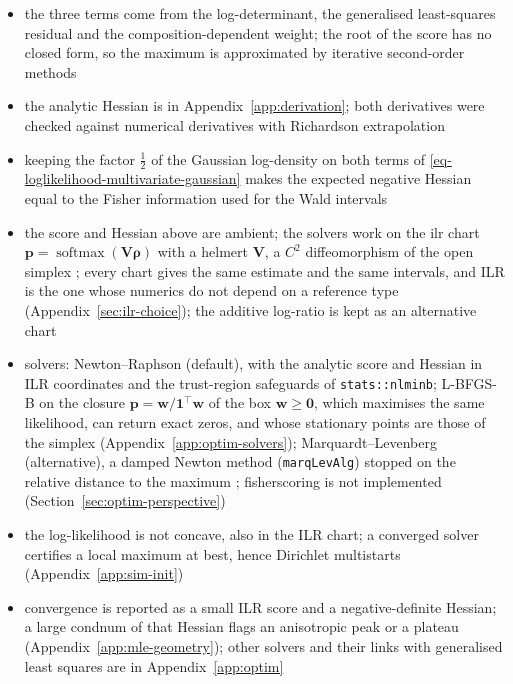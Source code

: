 \documentclass[pdflatex, sn-nature]{sn-jnl}
\theoremstyle{thmstyleone}%
\theoremstyle{thmstyletwo}%
\theoremstyle{thmstylethree}%
\begin{document}
\begin{itemize}
  \item the three terms come from the log-determinant, the generalised least-squares residual and the
        composition-dependent weight; the root of the score has no closed form, so the maximum is
        approximated by iterative second-order methods
  \item the analytic Hessian is in Appendix~\ref{app:derivation}; both derivatives were checked against
        numerical derivatives with Richardson extrapolation \cite{R-numDeriv}
  \item keeping the factor \(\frac12\) of the Gaussian log-density on both terms of
        \eqref{eq-loglikelihood-multivariate-gaussian} makes the expected negative Hessian equal to the
        Fisher information used for the Wald intervals
  \item the score and Hessian above are \gls{ambient}; the solvers work on the \gls{ilr} \gls{chart}
        \(\boldsymbol{p}=\operatorname{softmax}(\mathbf{V}\boldsymbol{\rho})\) with a \gls{helmert} \(\mathbf{V}\), a \(C^{2}\) diffeomorphism of the
        open simplex \cite{egozcueIsometricLogratioTransformations2003}; every chart gives the same estimate and the
        same intervals, and ILR is the one whose numerics do not depend on a reference type
        (Appendix~\ref{sec:ilr-choice}); the additive log-ratio is kept as an alternative chart
  \item solvers: Newton--Raphson (default), with the analytic score and Hessian in ILR coordinates and the
        trust-region safeguards of \texttt{stats::nlminb}; L-BFGS-B on the closure
        \(\boldsymbol{p}=\boldsymbol{w}/\mathbf{1}^{\top}\boldsymbol{w}\) of the box \(\boldsymbol{w}\ge\mathbf{0}\), which maximises the same
        likelihood, can return exact zeros, and whose stationary points are those of the simplex
        (Appendix~\ref{app:optim-solvers}); Marquardt--Levenberg (alternative), a damped Newton
        method (\texttt{marqLevAlg}) stopped on the relative distance to the maximum
        \cite{marquardtAlgorithmLeastSquaresEstimation1963,philippsRobustEfficientOptimization2021,commengesNewtonLikeAlgorithmLikelihood2006};
        \gls{fisherscoring} is not implemented (Section~\ref{sec:optim-perspective})
  \item the log-likelihood is not concave, also in the ILR chart; a converged solver certifies a
        local maximum at best, hence Dirichlet multistarts (Appendix~\ref{app:sim-init})
  \item convergence is reported as a small ILR score and a negative-definite Hessian; a large \gls{condnum}
        of that Hessian flags an anisotropic peak or a plateau (Appendix~\ref{app:mle-geometry}); other solvers
        and their links with generalised least squares are in Appendix~\ref{app:optim}
\end{itemize}
\end{document}
